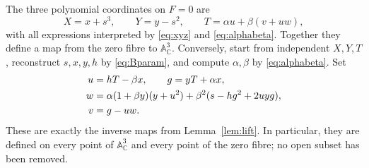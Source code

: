 \documentclass[11pt]{article}
\numberwithin{equation}{section}
\newcommand{\CC}{\mathbb C}
\newcommand{\Aff}{\mathbb A}
\begin{document}
The three polynomial coordinates on $F=0$ are
\begin{equation}
  X=x+s^3,\qquad Y=y-s^2,\qquad
  T=\alpha u+\beta(v+uw), \label{eq:fibercoords}
\end{equation}
with all expressions interpreted by \eqref{eq:xyz} and \eqref{eq:alphabeta}.
Together they define a map from the zero fibre to $\Aff^3_{\CC}$.
Conversely, start from independent $X,Y,T$, reconstruct $s,x,y,h$ by
\eqref{eq:Bparam}, and compute $\alpha,\beta$ by \eqref{eq:alphabeta}. Set
\begin{align}
  u&=hT-\beta x,\qquad g=yT+\alpha x,\notag\\
  w&=\alpha(1+\beta y)(y+u^2)
        +\beta^2(s-hg^2+2uyg),\notag\\
  v&=g-uw. \label{eq:explicitinverse}
\end{align}
These are exactly the inverse maps from Lemma~\ref{lem:lift}.
In particular, they are defined on every point of $\Aff^3_{\CC}$ and every
point of the zero fibre; no open subset has been removed.
\end{document}
